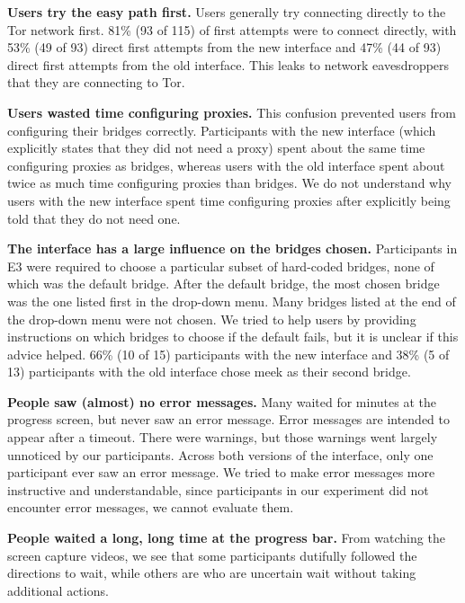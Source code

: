\documentclass[USenglish,oneside,twocolumn]{article}
\begin{document}
\begin{description}
\item {\bfseries Users try the easy path first.} Users generally try connecting directly to the Tor network first. 81\% (93 of 115) of first attempts were to connect directly, with 53\% (49 of 93) direct first attempts from the new interface and 47\% (44 of 93) direct first attempts from the old interface. This leaks to network eavesdroppers that they are connecting to Tor.

\item {\bfseries Users wasted time configuring proxies.} This confusion prevented users from configuring their bridges correctly. Participants with the new interface (which explicitly states that they did not need a proxy) spent about the same time configuring proxies as bridges, whereas users with the old interface spent about twice as much time configuring proxies than bridges. We do not understand why users with the new interface spent time configuring proxies after explicitly being told that they do not need one.

\item {\bfseries The interface has a large influence on the bridges chosen.}
Participants in E3 were required to choose a particular subset of hard-coded bridges, none of which was the default bridge. After the default bridge, the most chosen bridge was the one listed first in the drop-down menu. Many bridges listed at the end of the drop-down menu were not chosen. We tried to help users by providing instructions on which bridges to choose if the default fails, but it is unclear if this advice helped. 66\% (10 of 15) participants with the new interface and 38\% (5 of 13) participants with the old interface chose meek as their second bridge.

\item {\bfseries People saw (almost) no error messages.} Many waited for minutes at the progress screen, but never saw an error message. Error messages are intended to appear after a timeout. There were warnings, but those warnings went largely unnoticed by our participants. Across both versions of the interface, only one participant ever saw an error message. We tried to make error messages more instructive and understandable, since participants in our experiment did not encounter error messages, we cannot evaluate them. 

\item {\bfseries People waited a long, long time at the progress bar.}
From watching the screen capture videos, we see that some participants dutifully followed the directions to wait, while others are who are uncertain wait without taking additional actions.
\end{description}
\end{document}
